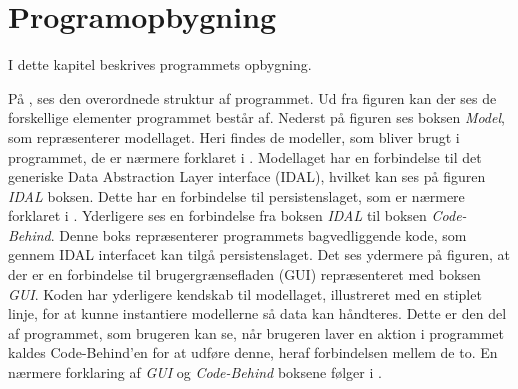 \chapter{Programopbygning}

I dette kapitel beskrives programmets opbygning. 



På , ses den overordnede struktur af programmet.
Ud fra figuren kan der ses de forskellige elementer programmet består af.
Nederst på figuren ses boksen \textit{Model}, som repræsenterer modellaget.
Heri findes de modeller, som bliver brugt i programmet, de er nærmere forklaret i .
Modellaget har en forbindelse til det generiske Data Abstraction Layer interface (IDAL), hvilket kan ses på figuren \textit{IDAL} boksen.
Dette har en forbindelse til persistenslaget, som er nærmere forklaret i .
Yderligere ses en forbindelse fra boksen \textit{IDAL} til boksen \textit{Code-Behind}. 
Denne boks repræsenterer programmets bagvedliggende kode, som gennem IDAL interfacet kan tilgå persistenslaget. 
Det ses ydermere på figuren, at der er en forbindelse til brugergrænsefladen (GUI) repræsenteret med boksen \textit{GUI}.
Koden har yderligere kendskab til modellaget, illustreret med en stiplet linje, for at kunne instantiere modellerne så data kan håndteres.
Dette er den del af programmet, som brugeren kan se, når brugeren laver en aktion i programmet kaldes Code-Behind'en for at udføre denne, heraf forbindelsen mellem de to. 
En nærmere forklaring af \textit{GUI} og \textit{Code-Behind} boksene følger i .
